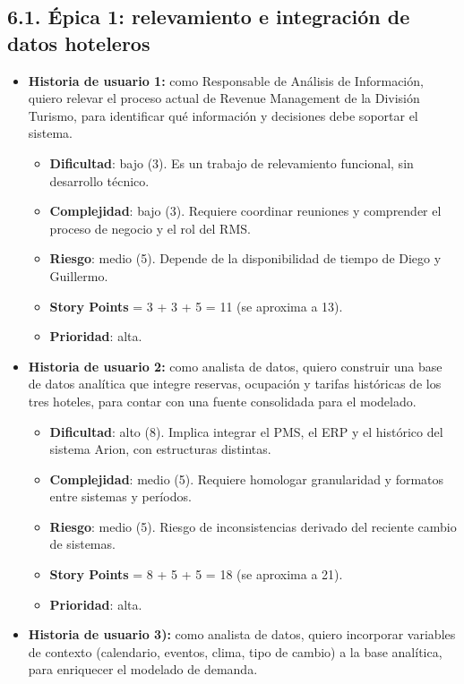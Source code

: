 \documentclass[
11pt, %
]{charter}
\begin{document}
\subsection*{6.1. Épica 1: relevamiento e integración de datos hoteleros}
\begin{itemize}
  \item \textbf{Historia de usuario 1:} como Responsable de Análisis de Información, quiero relevar el proceso actual de Revenue Management de la División Turismo, para identificar qué información y decisiones debe soportar el sistema.
    \begin{itemize}
      \item \textbf{Dificultad}: bajo (3). Es un trabajo de relevamiento funcional, sin desarrollo técnico.
      \item \textbf{Complejidad}: bajo (3). Requiere coordinar reuniones y comprender el proceso de negocio y el rol del RMS.
      \item \textbf{Riesgo}: medio (5). Depende de la disponibilidad de tiempo de Diego y Guillermo.
      \item \textbf{Story Points} = 3 + 3 + 5 = 11 (se aproxima a 13).
      \item \textbf{Prioridad}: alta.
    \end{itemize}
  \item \textbf{Historia de usuario 2:} como analista de datos, quiero construir una base de datos analítica que integre reservas, ocupación y tarifas históricas de los tres hoteles, para contar con una fuente consolidada para el modelado.
    \begin{itemize}
      \item \textbf{Dificultad}: alto (8). Implica integrar el PMS, el ERP y el histórico del sistema Arion, con estructuras distintas.
      \item \textbf{Complejidad}: medio (5). Requiere homologar granularidad y formatos entre sistemas y períodos.
      \item \textbf{Riesgo}: medio (5). Riesgo de inconsistencias derivado del reciente cambio de sistemas.
      \item \textbf{Story Points} = 8 + 5 + 5 = 18 (se aproxima a 21).
      \item \textbf{Prioridad}: alta.
    \end{itemize}
  \item \textbf{Historia de usuario 3):} como analista de datos, quiero incorporar variables de contexto (calendario, eventos, clima, tipo de cambio) a la base analítica, para enriquecer el modelado de demanda.

\end{itemize}
\end{document}
